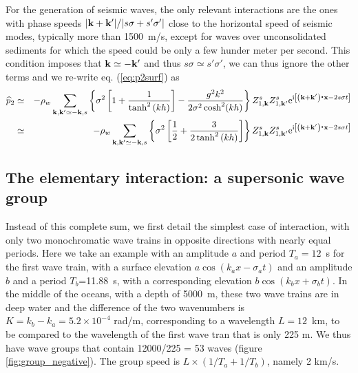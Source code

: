 For the generation of seismic waves, the only relevant interactions are the ones with phase speeds $|\mathbf{k}+\mathbf{k^{\prime}}|/|s \sigma+ s' \sigma'|$ close to the 
horizontal speed of seismic modes, typically more than 1500~m/s, except for waves over unconsolidated sediments for which the speed could be only a few hunder meter per second.   
This condition imposes that $\mathbf{k} \simeq -\mathbf{k^{\prime}}$ and thus $s \sigma \simeq s' \sigma'$, we can thus ignore the other terms and we re-write eq. (\ref{eq:p2surf}) as 
\begin{eqnarray}
     \widehat{p}_{2} &\simeq &  -\rho_w \sum_{\mathbf{k},\mathbf{k^{\prime}} \simeq -\mathbf{k},s}     
      \left\{ \sigma^2 \left[1 + \frac{1}{\tanh^2 \left(k h \right)} \right]  -
\frac{g^2 k^2}{2 \sigma^2 \cosh^2(kh)}\right\}
    Z_{1,\mathbf{k}}^{s} Z_{1,\mathbf{k^{\prime}}}^{s} \mathrm{e}^{\mathrm{i}
    \left[\left( \mathbf{k}+\mathbf{k^{\prime}}\right)\mbox{\boldmath $\cdot$}{\mathbf x} - 2 s \sigma   t\right]} \nonumber \\
&\simeq &  -\rho_w \sum_{\mathbf{k},\mathbf{k^{\prime}} \simeq -\mathbf{k},s}     
      \left\{ \sigma^2 \left[\frac{1}{2} + \frac{3}{2\tanh^2 \left(k h \right)} \right] \right\}
    Z_{1,\mathbf{k}}^{s} Z_{1,\mathbf{k^{\prime}}}^{s} \mathrm{e}^{\mathrm{i}
    \left[\left( \mathbf{k}+\mathbf{k^{\prime}}\right)\mbox{\boldmath $\cdot$}{\mathbf x} - 2 s \sigma  t\right]} \label{p2_amplitude}
\end{eqnarray}

\subsection{The elementary interaction: a supersonic wave group}
Instead of this complete sum, we first detail the simplest case of interaction, with only two monochromatic wave trains in opposite directions with nearly equal periods. Here we take an example 
with an amplitude $a$ and period $T_a=12$~s for the first wave train, with a surface elevation $a \cos(k_a x -\sigma_a t)$ and an amplitude $b$ and a period  
$T_b$=11.88~s, with a corresponding elevation $b \cos(k_b x+ \sigma_b t)$. In the middle of the oceans, with a depth of 5000~m, these two wave trains 
are in deep water and the difference of the two wavenumbers is  $K=k_b-k_a=5.2 \times 10^{-4}$ rad/m, corresponding to a wavelength $L=12$~km, to be compared 
to the wavelength of the first wave tran that is only 225 m. We thus have wave groups that contain 12000/225 = 53 waves (figure \ref{fig:group_negative}). 
The group speed is  $L \times (1/T_a + 1/T_b)$, namely 2 km/s.  

